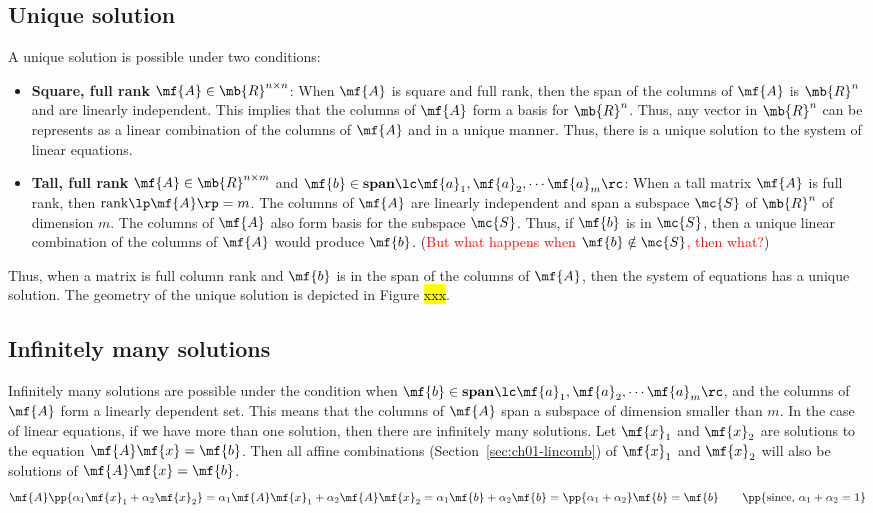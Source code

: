 \subsection{Unique solution}
A unique solution is possible under two conditions:
\begin{itemize}
    \item \textbf{Square, full rank } $\mf{A} \in \mb{R}^{n \times n}$: When $\mf{A}$ is square and full rank, then the span of the columns of $\mf{A}$ is $\mb{R}^n$ and are linearly independent. This implies that the columns of $\mf{A}$ form a basis for $\mb{R}^n$. Thus, any vector in $\mb{R}^n$ can be represents as a linear combination of the columns of $\mf{A}$ and in a unique manner. Thus, there is a unique solution to the system of linear equations. 
    
    \item \textbf{Tall, full rank } $\mf{A} \in \mb{R}^{n \times m}$ and $\mf{b} \in \textbf{span}\lc \mf{a}_1, \mf{a}_2, \cdots \mf{a}_m\rc$: When a tall matrix $\mf{A}$ is full rank, then $\text{rank}\lp \mf{A} \rp = m$. The columns of $\mf{A}$ are linearly independent and span a subspace $\mc{S}$ of $\mb{R}^n$ of dimension $m$. The columns of $\mf{A}$ also form basis for the subspace $\mc{S}$. Thus, if $\mf{b}$ is in $\mc{S}$, then a unique linear combination of the columns of $\mf{A}$ would produce $\mf{b}$. (\textcolor{red}{But what happens when $\mf{b} \notin \mc{S}$, then what?})
\end{itemize}

Thus, when a matrix is full column rank and $\mf{b}$ is in the span of the columns of $\mf{A}$, then the system of equations has a unique solution. The geometry of the unique solution is depicted in Figure \hl{xxx}.

\subsection{Infinitely many solutions}
Infinitely many solutions are possible under the condition when $\mf{b} \in \textbf{span}\lc \mf{a}_1, \mf{a}_2, \cdots \mf{a}_m \rc$, and the columns of $\mf{A}$ form a linearly dependent set. This means that the columns of $\mf{A}$ span a subspace of dimension smaller than $m$. In the case of linear equations, if we have more than one solution, then there are infinitely many solutions. Let $\mf{x}_1$ and $\mf{x}_2$ are solutions to the equation $\mf{A}\mf{x} = \mf{b}$. Then all affine combinations (Section~\ref{sec:ch01-lincomb}) of $\mf{x}_1$ and $\mf{x}_2$ will also be solutions of $\mf{A}\mf{x} = \mf{b}$.
\[ \mf{A}\pp{\alpha_1 \mf{x}_1 + \alpha_2 \mf{x}_2} = \alpha_1\mf{A}\mf{x}_1 + \alpha_2\mf{A}\mf{x}_2 = \alpha_1 \mf{b} + \alpha_2 \mf{b} = \pp{\alpha_1 + \alpha_2} \mf{b}  = \mf{b} \quad\quad \pp{\text{since, } \alpha_1 + \alpha_2 = 1} \]

